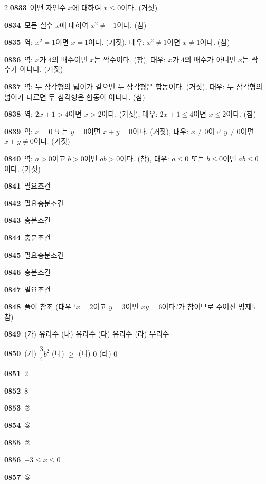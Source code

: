 \documentclass[10pt,a4paper]{article}
\begin{document}
\begin{multicols}{2}
\noindent\textbf{0833}\ 어떤 자연수 $x$에 대하여 $x\le 0$이다. (거짓)\par
\noindent\textbf{0834}\ 모든 실수 $x$에 대하여 $x^2\ne -1$이다. (참)\par
\noindent\textbf{0835}\ 역: $x^2=1$이면 $x=1$이다. (거짓), 대우: $x^2\ne 1$이면 $x\ne 1$이다. (참)\par
\noindent\textbf{0836}\ 역: $x$가 $4$의 배수이면 $x$는 짝수이다. (참), 대우: $x$가 $4$의 배수가 아니면 $x$는 짝수가 아니다. (거짓)\par
\noindent\textbf{0837}\ 역: 두 삼각형의 넓이가 같으면 두 삼각형은 합동이다. (거짓), 대우: 두 삼각형의 넓이가 다르면 두 삼각형은 합동이 아니다. (참)\par
\noindent\textbf{0838}\ 역: $2x+1>4$이면 $x>2$이다. (거짓), 대우: $2x+1\le 4$이면 $x\le 2$이다. (참)\par
\noindent\textbf{0839}\ 역: $x=0$ 또는 $y=0$이면 $x+y=0$이다. (거짓), 대우: $x\ne 0$이고 $y\ne 0$이면 $x+y\ne 0$이다. (거짓)\par
\noindent\textbf{0840}\ 역: $a>0$이고 $b>0$이면 $ab>0$이다. (참), 대우: $a\le 0$ 또는 $b\le 0$이면 $ab\le 0$이다. (거짓)\par
\noindent\textbf{0841}\ 필요조건\par
\noindent\textbf{0842}\ 필요충분조건\par
\noindent\textbf{0843}\ 충분조건\par
\noindent\textbf{0844}\ 충분조건\par
\noindent\textbf{0845}\ 필요충분조건\par
\noindent\textbf{0846}\ 충분조건\par
\noindent\textbf{0847}\ 필요조건\par
\noindent\textbf{0848}\ 풀이 참조 (대우 `$x=2$이고 $y=3$이면 $xy=6$이다.'가 참이므로 주어진 명제도 참)\par
\noindent\textbf{0849}\ (가) 유리수 (나) 유리수 (다) 유리수 (라) 무리수\par
\noindent\textbf{0850}\ (가) $\dfrac{3}{4}b^2$ (나) $\ge$ (다) $0$ (라) $0$\par
\noindent\textbf{0851}\ $2$\par
\noindent\textbf{0852}\ $8$\par
\noindent\textbf{0853}\ ②\par
\noindent\textbf{0854}\ ⑤\par
\noindent\textbf{0855}\ ②\par
\noindent\textbf{0856}\ $-3\le x\le 0$\par
\noindent\textbf{0857}\ ⑤\par

\end{multicols}
\end{document}
